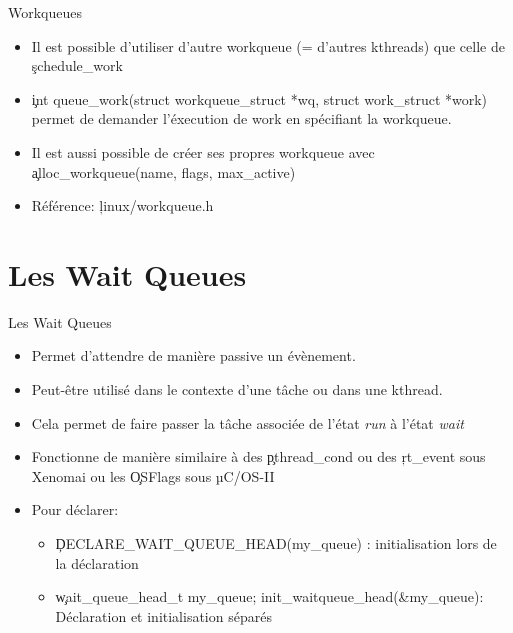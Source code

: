 \begin{frame}[fragile=singleslide]{Workqueues}
  \begin{itemize} 
  \item  Il  est possible  d'utiliser  d'autre  workqueue (=  d'autres
    kthreads) que celle de \c{schedule_work}
  \item
    \c{int queue_work(struct workqueue_struct *wq, struct work_struct *work)}
    permet de demander l'éxecution de work en spécifiant la workqueue.
  \item  Il est  aussi possible  de créer  ses propres  workqueue avec
    \c{alloc_workqueue(name, flags, max_active)}
  \item Référence: \c{linux/workqueue.h}
  \end{itemize}
\end{frame}

\section{Les Wait Queues}

\begin{frame}[fragile=singleslide]{Les Wait Queues}
  \begin{itemize} 
  \item Permet d'attendre de manière passive un évènement. 
  \item Peut-être utilisé
    dans le contexte d'une tâche ou dans une kthread.
  \item  Cela permet  de  faire  passer la  tâche  associée de  l'état
    \emph{run} à l'état \emph{wait}
  \item Fonctionne de manière  similaire à des \c{pthread_cond} ou des
    \c{rt_event} sous Xenomai ou les \c{OSFlags} sous µC/OS-II
  \item Pour déclarer:
    \begin{itemize} 
    \item \c{DECLARE_WAIT_QUEUE_HEAD(my_queue)} : initialisation lors de
      la déclaration
    \item
      \c{wait_queue_head_t  my_queue; init_waitqueue_head(&my_queue)}:
      Déclaration et initialisation séparés
    \end{itemize} 
  \end{itemize}
\end{frame}

